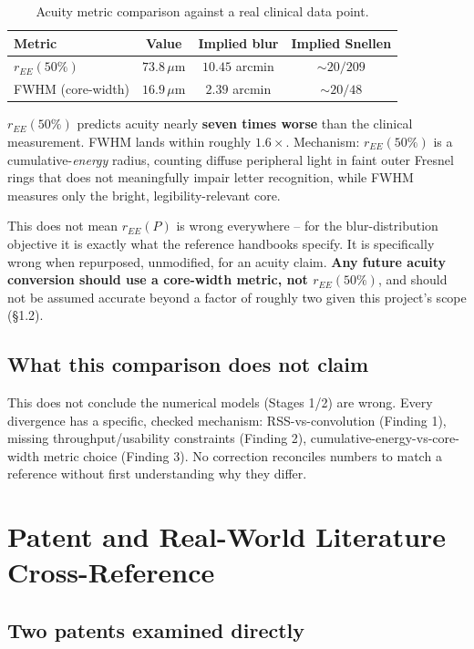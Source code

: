 \documentclass[11pt]{report}
\begin{document}
\begin{table}[h!]
\centering
\caption{Acuity metric comparison against a real clinical data point.}
\begin{tabular}{lccc}
\toprule
Metric & Value & Implied blur & Implied Snellen \\
\midrule
$r_{EE}(50\%)$ & $73.8\,\mu$m & $10.45$ arcmin & $\sim 20/209$ \\
FWHM (core-width) & $16.9\,\mu$m & $2.39$ arcmin & $\sim 20/48$ \\
\bottomrule
\end{tabular}
\end{table}

$r_{EE}(50\%)$ predicts acuity nearly \textbf{seven times worse} than the clinical measurement. FWHM lands within roughly $1.6\times$. Mechanism: $r_{EE}(50\%)$ is a cumulative-\emph{energy} radius, counting diffuse peripheral light in faint outer Fresnel rings that does not meaningfully impair letter recognition, while FWHM measures only the bright, legibility-relevant core.

This does not mean $r_{EE}(P)$ is wrong everywhere -- for the blur-distribution objective it is exactly what the reference handbooks specify. It is specifically wrong when repurposed, unmodified, for an acuity claim. \textbf{Any future acuity conversion should use a core-width metric, not $r_{EE}(50\%)$}, and should not be assumed accurate beyond a factor of roughly two given this project's scope (\S1.2).

\section{What this comparison does not claim}
This does not conclude the numerical models (Stages 1/2) are wrong. Every divergence has a specific, checked mechanism: RSS-vs-convolution (Finding 1), missing throughput/usability constraints (Finding 2), cumulative-energy-vs-core-width metric choice (Finding 3). No correction reconciles numbers to match a reference without first understanding why they differ.

\chapter{Patent and Real-World Literature Cross-Reference}
\label{sec:patents}

\section{Two patents examined directly}
\end{document}
